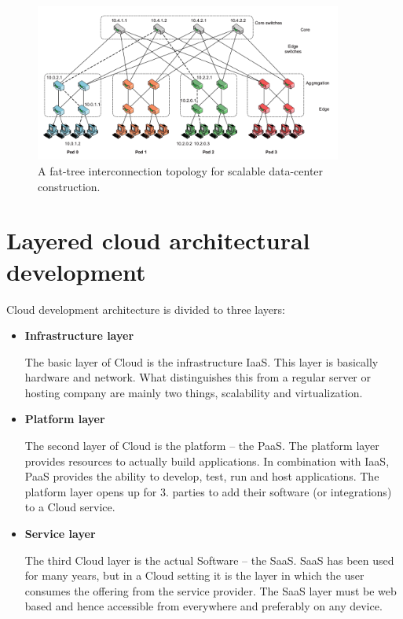 \documentclass[12pt]{report}
\begin{document}
\begin{figure}[ht]
		\centering
           \includegraphics[width=0.9\textwidth]{centerconn.png}
         \caption{A fat-tree interconnection topology for scalable data-center construction.}
         \label{centerconn}
\end{figure} 

\section{Layered cloud architectural development}
Cloud development architecture is divided to three layers:
\begin{itemize}
\item \textbf{Infrastructure layer}

			The basic layer of Cloud is the infrastructure IaaS. This layer is basically hardware and network. What distinguishes this from a regular server or hosting company are mainly two things, scalability and virtualization.
\item \textbf{Platform layer}

			The second layer of Cloud is the platform – the PaaS. The platform layer provides resources to actually build applications. In combination with IaaS, PaaS provides the ability to develop, test, run and host applications. The platform layer opens up for 3. parties to add their software (or integrations) to a Cloud service.
\item \textbf{Service layer}

			The third Cloud layer is the actual Software – the SaaS. SaaS has been used for many years, but in a Cloud setting it is the layer in which the user consumes the offering from the service provider. The SaaS layer must be web based and hence accessible from everywhere and preferably on any device.
\end{itemize}
\end{document}
